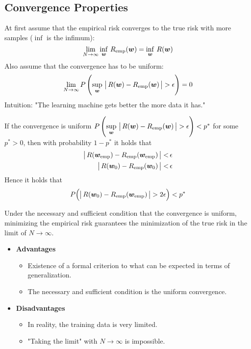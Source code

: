 		\subsection{Convergence Properties}
			At first assume that the empirical risk converges to the true risk with more samples (\(\inf\) is the infimum):
			\begin{equation}
				\lim\limits_{N \to \infty} \inf\limits_{\bm{w}} \, R_{{\operatorname{emp}}}(\bm{w}) = \inf\limits_{\bm{w}} \, R(\bm{w})
			\end{equation}
			Also assume that the convergence has to be uniform:
			\begin{equation}
				\lim\limits_{N \to \infty} P\,\Bigg(\! \sup\limits_{\bm{w}} \, \big\lvert\, R(\bm{w}) - R_{{\operatorname{emp}}}(\bm{w}) \,\big\rvert > \epsilon \Bigg) = 0
			\end{equation}
			Intuition: "The learning machine gets better the more data it has."

			If the convergence is uniform \( P\,\Bigg(\! \sup\limits_{\bm{w}} \, \big\lvert\, R(\bm{w}) - R_{{\operatorname{emp}}}(\bm{w}) \,\big\rvert > \epsilon \Bigg) < p^\ast \) for some \( p^\ast > 0 \), then with probability \( 1 - p^\ast \) it holds that
			\begin{align}
				\big\lvert\, R(\bm{w}_{{\operatorname{emp}}}) - R_{{\operatorname{emp}}}(\bm{w}_{{\operatorname{emp}}}) \,\big\rvert < & \,\epsilon \\
				\big\lvert\, R(\bm{w}_0) - R_{{\operatorname{emp}}}(\bm{w}_0) \,\big\rvert <               & \,\epsilon
			\end{align}
			Hence it holds that
			\begin{equation}
				P\Big( \big\lvert\, R(\bm{w}_0) - R_{{\operatorname{emp}}}(\bm{w}_{{\operatorname{emp}}}) \,\big\rvert > 2\epsilon \Big) < p^\ast \\
			\end{equation}

			Under the necessary and sufficient condition that the convergence is uniform, minimizing the empirical risk guarantees the minimization of the true risk in the limit of \( N \to \infty \).

			\begin{itemize}
				\item \textbf{Advantages}
					\begin{itemize}
						\item Existence of a formal criterion to what can be expected in terms of generalization.
						\item The necessary and sufficient condition is the uniform convergence.
					\end{itemize}
				\item \textbf{Disadvantages}
					\begin{itemize}
						\item In reality, the training data is very limited.
						\item "Taking the limit" with \( N \to \infty \) is impossible.
					\end{itemize}
			\end{itemize}

